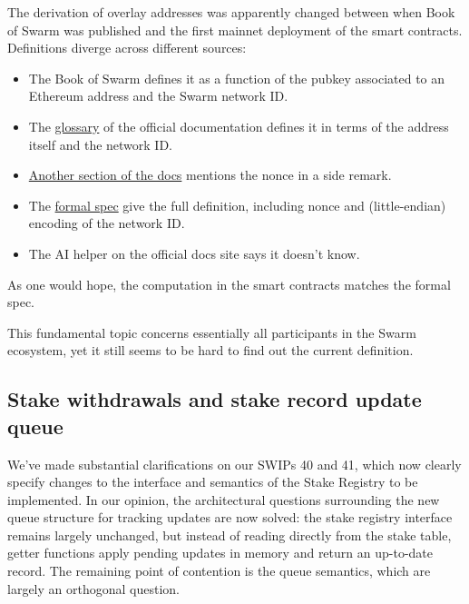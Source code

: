 \begin{example*}

The derivation of overlay addresses was apparently changed between when Book of Swarm was published and the first mainnet deployment of the smart contracts.
%
Definitions diverge across different sources:

\begin{itemize}
\item The Book of Swarm defines it as a function of the pubkey associated to an Ethereum address and the Swarm network ID.
\item The \href{https://docs.ethswarm.org/docs/references/glossary/#overlay-address}{glossary} of the official documentation defines it in terms of the address itself and the network ID.
\item \href{https://docs.ethswarm.org/docs/bee/bee-faq/#can-i-use-one-ethereum-addresswallet-for-many-nodes}{Another section of the docs} mentions the nonce in a side remark.
\item The \href{https://papers.ethswarm.org/p/swarm-formal-spec/}{formal spec} give the full definition, including nonce and (little-endian) encoding of the network ID.
\item The AI helper on the official docs site says it doesn't know.
\end{itemize} 

As one would hope, the computation in the smart contracts matches the formal spec. 

This fundamental topic concerns essentially all participants in the Swarm ecosystem, yet it still seems to be hard to find out the current definition.

\end{example*}

\subsection*{Stake withdrawals and stake record update queue}

We've made substantial clarifications on our SWIPs 40 and 41, which now clearly specify changes to the interface and semantics of the Stake Registry to be implemented.
%
In our opinion, the architectural questions surrounding the new queue structure for tracking updates are now solved: the stake registry interface remains largely unchanged, but instead of reading directly from the stake table, getter functions apply pending updates in memory and return an up-to-date record.
%
The remaining point of contention is the queue semantics, which are largely an orthogonal question.

